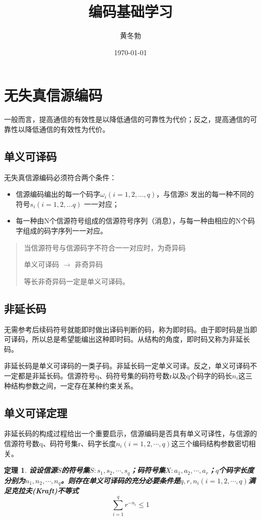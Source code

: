 \documentclass[UTF8]{ctexart}
\title{\heiti 编码基础学习}
\author{\kaishu 黄冬勃}
\date{\today}
\theoremstyle{plain}
\newtheorem{theorem}{定理}[section]
\theoremstyle{definition}
\theoremstyle{remark}
\newenvironment{myquote}
{\begin{quote}\kaishu\zihao{-5}}
{\end{quote}}
\begin{document}
\maketitle



\tableofcontents

\section{无失真信源编码}
\label{sec:ancient}
一般而言，提高通信的有效性是以降低通信的可靠性为代价；反之，提高通信的可靠性以降低通信的有效性为代价。
\subsection{单义可译码}
\textcolor[rgb]{1.00,0.00,0.00}{无失真信源编码必须符合两个条件}：
\begin{itemize}
  \item 信源编码编出的每一个码字$\omega_i(i=1,2,...,q)$，与信源S 发出的每一种不同的符号$s_i(i=1,2,...q)$ 一一对应；
  \item 每一种由N个信源符号组成的信源符号序列（消息），与每一种由相应的N个码字组成的码字序列一一对应。
\end{itemize}

\begin{myquote}
当信源符号与信源码字不符合一一对应时，为奇异码

单义可译码 $\rightarrow$ 非奇异码

等长非奇异码一定是单义可译码。
\end{myquote}

\subsection{非延长码}
无需参考后续码符号就能即时做出译码判断的码，称为即时码。由于即时码是当即可译码，所以总是希望能编出这种即时码。从结构的角度，即时码又称为非延长码。

非延长码是单义可译码的一类子码。非延长码一定单义可译。反之，单义可译码不一定都是非延长码。信源符号q、码符号集的码符号数r以及q个码字的码长$n_i$这三种结构参数之间，一定存在某种约束关系。

\subsection{单义可译定理}
非延长码的构成过程给出一个重要启示，信源编码是否具有单义可译性，与信源的信源符号数q、码符号集r、码字长度$n_i(i=1,2,\cdots,q)$这三个编码结构参数密切相关。
\begin{theorem}
	\label{th6.1}
	\textbf{设设信源$S$的符号集$S:{s_1,s_2,\cdots,s_q}$；码符号集$X:{a_1,a_2,\cdots,a_r}$；$q$个码字长度分别为$n_1,n_2,\cdots,n_q$。则存在单义可译码的充分必要条件是$q,r,n_i(i=1,2,\cdots,q)$满足克拉夫(\textcolor[rgb]{1,0,0}{\emph{Kraft}})不等式}
	\[
		\sum\limits_{i=1}^{q}r^{-n_i}\leqslant1
	\]
\end{theorem}
\end{document}
